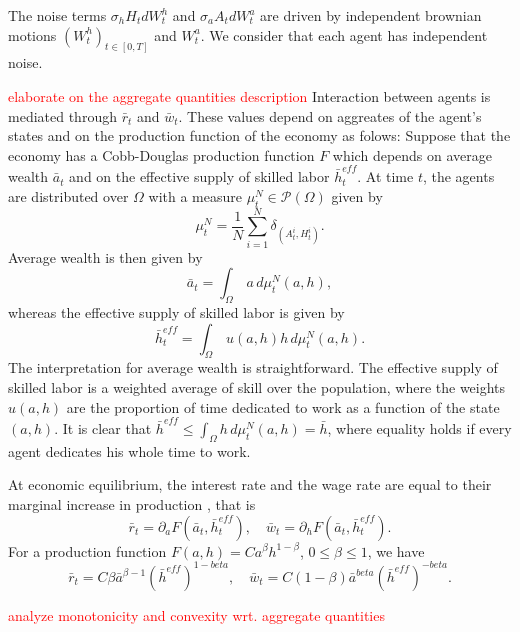 The noise terms $\sigma_h H_t dW^h_t$ and $\sigma_a A_t dW^a_t$ are driven by independent brownian motions $(W^h_t)_{t \in [0,T]}$ and $W^a_t$.
We consider that each agent has independent noise.

\textcolor{red}{elaborate on the aggregate quantities description}
Interaction between agents is mediated through $\bar r_t$ and $\bar w_t$.
These values depend on aggreates of the agent's states and on the production function of the economy as folows:
Suppose that the economy has a Cobb-Douglas production \cite{find a citation for cobb douglas} function $F$ which depends on average wealth $\bar a_t$ 
and on the effective supply of skilled labor $\bar h_t^{eff}$.
At time $t$, the agents are distributed over $\Omega$ with a measure $\mu^N_t \in \mathcal{P}(\Omega)$ given by
\[
\mu^N_t = \frac{1}{N} \sum_{i = 1}^N \delta_{(A^i_t, H^i_t)}.
\]
Average wealth is then given by
\[
\bar a_t = \int_\Omega \, a \, d\mu^N_t (a,h),
\]
whereas the effective supply of skilled labor is given by
\[
\bar h_t^{eff} = \int_\Omega \, u(a,h) h \, d\mu^N_t (a,h).
\]
The interpretation for average wealth is straightforward.
The effective supply of skilled labor is a weighted average of skill over the population, where the weights $u(a,h)$ are the proportion of time dedicated to work as a function of the state $(a,h)$.
It is clear that $\bar h^{eff} \leq \int_\Omega  h \, d\mu^N_t (a,h) = \bar h$, where equality holds if every agent dedicates his whole time to work.

At economic equilibrium, the interest rate and the wage rate are equal to their marginal increase in production \cite{find a citation for this}, that is
\[
\bar r_t= \partial_a F(\bar a_t, \bar h_t^{eff}), \quad \bar w_t= \partial_h F(\bar a_t, \bar h_t^{eff}).
\]
For a production function $F(a,h) = C a^\beta h^{1 - \beta}$, $0 \leq \beta \leq 1$, we have
\[
\bar r_t = C \beta {\bar a}^{\beta - 1} ({\bar h^{eff}})^{1 - beta}, \quad  \bar w_t = C (1 - \beta) {\bar a}^{beta} ({\bar h^{eff}})^{ - beta}.
\]


\textcolor{red}{analyze monotonicity and convexity wrt. aggregate quantities}


